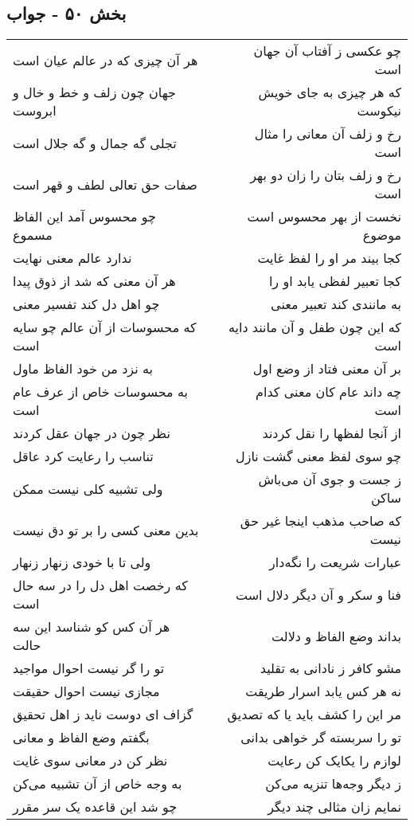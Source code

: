 \begin{center}
\section*{بخش ۵۰ - جواب}
\label{sec:sh050}
\begin{longtable}{l p{0.5cm} r}
هر آن چیزی که در عالم عیان است
&&
چو عکسی ز آفتاب آن جهان است
\\
جهان چون زلف و خط و خال و ابروست
&&
که هر چیزی به جای خویش نیکوست
\\
تجلی گه جمال و گه جلال است
&&
رخ و زلف آن معانی را مثال است
\\
صفات حق تعالی لطف و قهر است
&&
رخ و زلف بتان را زان دو بهر است
\\
چو محسوس آمد این الفاظ مسموع
&&
نخست از بهر محسوس است موضوع
\\
ندارد عالم معنی نهایت
&&
کجا بیند مر او را لفظ غایت
\\
هر آن معنی که شد از ذوق پیدا
&&
کجا تعبیر لفظی یابد او را
\\
چو اهل دل کند تفسیر معنی
&&
به مانندی کند تعبیر معنی
\\
که محسوسات از آن عالم چو سایه است
&&
که این چون طفل و آن مانند دایه است
\\
به نزد من خود الفاظ ماول
&&
بر آن معنی فتاد از وضع اول
\\
به محسوسات خاص از عرف عام است
&&
چه داند عام کان معنی کدام است
\\
نظر چون در جهان عقل کردند
&&
از آنجا لفظها را نقل کردند
\\
تناسب را رعایت کرد عاقل
&&
چو سوی لفظ معنی گشت نازل
\\
ولی تشبیه کلی نیست ممکن
&&
ز جست و جوی آن می‌باش ساکن
\\
بدین معنی کسی را بر تو دق نیست
&&
که صاحب مذهب اینجا غیر حق نیست
\\
ولی تا با خودی زنهار زنهار
&&
عبارات شریعت را نگه‌دار
\\
که رخصت اهل دل را در سه حال است
&&
فنا و سکر و آن دیگر دلال است
\\
هر آن کس کو شناسد این سه حالت
&&
بداند وضع الفاظ و دلالت
\\
تو را گر نیست احوال مواجید
&&
مشو کافر ز نادانی به تقلید
\\
مجازی نیست احوال حقیقت
&&
نه هر کس یابد اسرار طریقت
\\
گزاف ای دوست ناید ز اهل تحقیق
&&
مر این را کشف باید یا که تصدیق
\\
بگفتم وضع الفاظ و معانی
&&
تو را سربسته گر خواهی بدانی
\\
نظر کن در معانی سوی غایت
&&
لوازم را یکایک کن رعایت
\\
به وجه خاص از آن تشبیه می‌کن
&&
ز دیگر وجه‌ها تنزیه می‌کن
\\
چو شد این قاعده یک سر مقرر
&&
نمایم زان مثالی چند دیگر
\\
\end{longtable}
\end{center}
